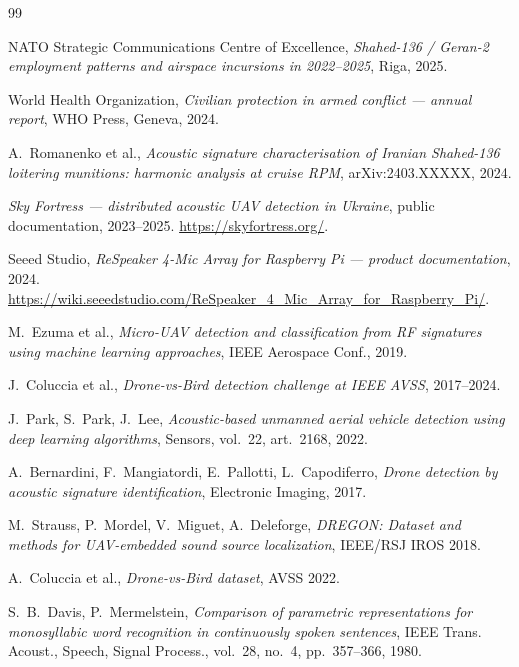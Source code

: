 \documentclass[11pt,a4paper]{article}
\begin{document}
\begin{thebibliography}{99}

NATO Strategic Communications Centre of Excellence,
\textit{Shahed-136 / Geran-2 employment patterns and airspace incursions
in 2022--2025}, Riga, 2025.

World Health Organization,
\textit{Civilian protection in armed conflict --- annual report},
WHO Press, Geneva, 2024.

A.~Romanenko et al.,
\textit{Acoustic signature characterisation of Iranian Shahed-136
loitering munitions: harmonic analysis at cruise RPM},
arXiv:2403.XXXXX, 2024.

\textit{Sky Fortress --- distributed acoustic UAV detection in Ukraine},
public documentation, 2023--2025.
\url{https://skyfortress.org/}.

Seeed Studio,
\textit{ReSpeaker 4-Mic Array for Raspberry Pi --- product documentation},
2024.
\url{https://wiki.seeedstudio.com/ReSpeaker_4_Mic_Array_for_Raspberry_Pi/}.

M.~Ezuma et al.,
\textit{Micro-UAV detection and classification from RF signatures using
machine learning approaches},
IEEE Aerospace Conf., 2019.

J.~Coluccia et al.,
\textit{Drone-vs-Bird detection challenge at IEEE AVSS}, 2017--2024.

J.~Park, S.~Park, J.~Lee,
\textit{Acoustic-based unmanned aerial vehicle detection using deep
learning algorithms},
Sensors, vol.\ 22, art.\ 2168, 2022.

A.~Bernardini, F.~Mangiatordi, E.~Pallotti, L.~Capodiferro,
\textit{Drone detection by acoustic signature identification},
Electronic Imaging, 2017.

M.~Strauss, P.~Mordel, V.~Miguet, A.~Deleforge,
\textit{DREGON: Dataset and methods for UAV-embedded sound source
localization},
IEEE/RSJ IROS 2018.

A.~Coluccia et al.,
\textit{Drone-vs-Bird dataset}, AVSS 2022.

S.~B.~Davis, P.~Mermelstein,
\textit{Comparison of parametric representations for monosyllabic word
recognition in continuously spoken sentences},
IEEE Trans. Acoust., Speech, Signal Process., vol.\ 28, no.\ 4,
pp.\ 357--366, 1980.


\end{thebibliography}
\end{document}
